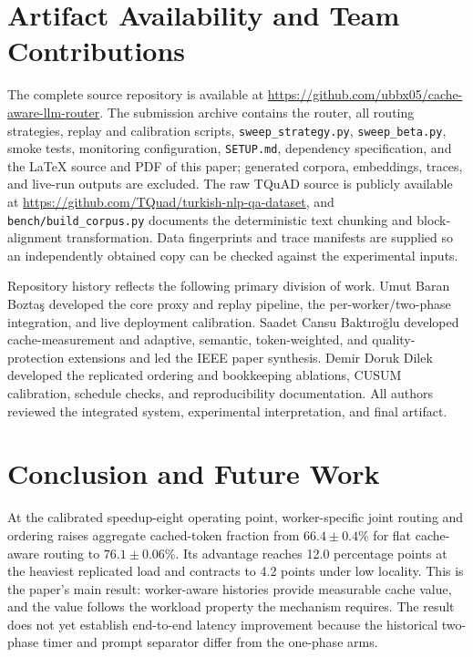 \documentclass[conference]{IEEEtran}
\begin{document}
\section{Artifact Availability and Team Contributions}

The complete source repository is available at
\url{https://github.com/ubbx05/cache-aware-llm-router}. The submission
archive contains the router, all routing strategies, replay and
calibration scripts, \texttt{sweep\_strategy.py}, \texttt{sweep\_beta.py},
smoke tests, monitoring configuration,
\texttt{SETUP.md}, dependency specification, and the \LaTeX{} source and
PDF of this paper; generated corpora, embeddings, traces, and live-run
outputs are excluded. The raw TQuAD source is publicly available at
\url{https://github.com/TQuad/turkish-nlp-qa-dataset}, and
\texttt{bench/build\_corpus.py} documents the deterministic text
chunking and block-alignment transformation. Data fingerprints and
trace manifests are supplied so an independently obtained copy can be
checked against the experimental inputs.

Repository history reflects the following primary division of work.
Umut Baran Boztaş developed the core proxy and replay pipeline, the
per-worker/two-phase integration, and live deployment calibration.
Saadet Cansu Baktıroğlu developed cache-measurement and adaptive,
semantic, token-weighted, and quality-protection extensions and led the
IEEE paper synthesis. Demir Doruk Dilek developed the replicated
ordering and bookkeeping ablations, CUSUM calibration, schedule checks,
and reproducibility documentation. All authors reviewed the integrated
system, experimental interpretation, and final artifact.

\section{Conclusion and Future Work}

At the calibrated speedup-eight operating point, worker-specific joint
routing and ordering raises aggregate cached-token fraction from
$66.4\pm0.4\%$ for flat cache-aware routing to $76.1\pm0.06\%$. Its
advantage reaches 12.0 percentage points at the heaviest replicated load
and contracts to 4.2 points under low locality. This is the paper's main
result: worker-aware histories provide measurable cache value, and the
value follows the workload property the mechanism requires. The result
does not yet establish end-to-end latency improvement because the
historical two-phase timer and prompt separator differ from the one-phase
arms.
\end{document}
